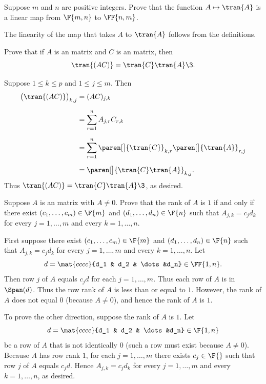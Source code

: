 \exercise
Suppose $m$ and $n$ are positive integers. Prove that the function $A \mapsto \tran{A}$ is a linear map from $\F{m, n}$ to
$\FF{n, m}$.\label{3translinear}

\begin{Solution}
The linearity of the map that takes $A$ to $\tran{A}$ follows from the definitions.
\end{Solution}

\pagebreak[3]

\exercise
Prove that if $A$ is an  matrix and $C$ is an  matrix, then\label{3tran}
\[
\tran{(AC)} = \tran{C} \tran{A}\3.
\]
\exercisedisplayend
{}

\begin{Solution}
Suppose $1 \le k \le p$ and $1 \le j \le m$. Then
\begin{align*}
\bigl(\tran{(AC)}\bigr)_{k,j} &= (AC)_{j,k} \\[6bp]
&= \sum_{r=1}^n A_{j,r} C_{r,k} \\[6bp]
&= \sum_{r=1}^n \paren[\big]{\tran{C}}_{k,r}\paren[\big]{\tran{A}}_{r, j}\\[6bp]
&= \paren[\big]{\tran{C} \tran{A}}_{k, j}.
\end{align*}
Thus $\tran{(AC)} = \tran{C} \tran{A}\3$, as desired.
\end{Solution}

\pagebreak[3]

\exercise
Suppose $A$ is an  matrix with $A \ne 0$. Prove that the rank of $A$ is $1$ if and only if there exist $(c_1, \dots, c_m) \in \F{m}$ and $(d_1, \dots, d_n)\in \F{n}$ such that $A_{j,k} = c_j d_k$ for every $j = 1, \dots, m$ and every $k = 1, \dots, n$.

\begin{Solution}
First suppose there exist $(c_1, \dots, c_m) \in \F{m}$ and $(d_1, \dots, d_n)\in \F{n}$ such that $A_{j,k} = c_j d_k$ for every $j = 1, \dots, m$ and every $k = 1, \dots, n$. Let
\[
d = \mat{cccc}{d_1 & d_2 & \dots &d_n} \in \FF{1,n}.
\]
Then row $j$ of $A$ equals $c_j d$ for each $j = 1, \dots, m$. Thus each row of $A$ is in $\Span(d)$. Thus the row rank of $A$ is less than or equal to $1$. However, the rank of $A$ does not equal $0$ (because $A \ne 0$), and hence the rank of $A$ is $1$.

To prove the other direction, suppose the rank of $A$ is $1$. Let
\[
d = \mat{cccc}{d_1 & d_2 & \dots &d_n} \in \F{1,n}
\]
be a row of $A$ that is not identically $0$ (such a row must exist because $A \ne 0$). Because $A$ has row rank $1$, for each $j = 1, \dots, m$ there exists $c_j \in \F{}$ such that row $j$ of $A$ equals $c_j d$. Hence $A_{j,k} = c_j d_k$ for every $j = 1, \dots, m$ and every $k = 1, \dots, n$, as desired.
\end{Solution}

